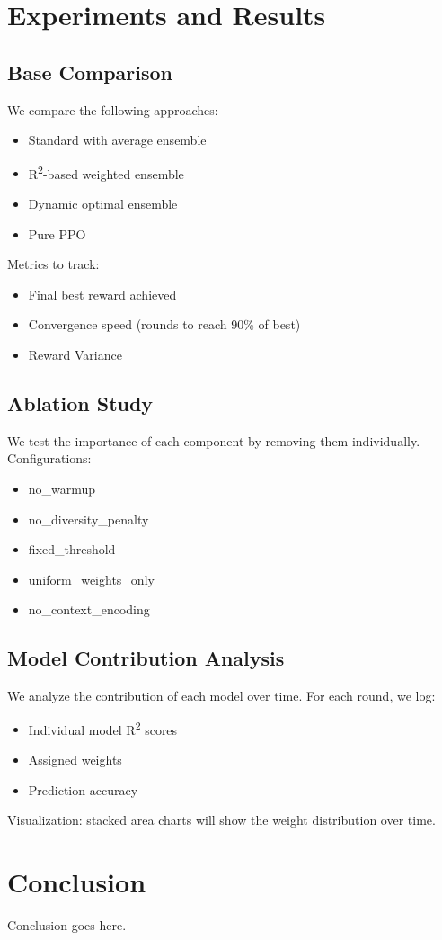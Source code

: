 \documentclass[conference]{IEEEtran}
\begin{document}
\section{Experiments and Results}

\subsection{Base Comparison}
We compare the following approaches:
\begin{itemize}
    \item Standard with average ensemble
    \item R\textsuperscript{2}-based weighted ensemble
    \item Dynamic optimal ensemble
    \item Pure PPO
\end{itemize}

Metrics to track:
\begin{itemize}
    \item Final best reward achieved
    \item Convergence speed (rounds to reach 90\% of best)
    \item Reward Variance
\end{itemize}

\subsection{Ablation Study}
We test the importance of each component by removing them individually.  
Configurations:
\begin{itemize}
    \item no\_warmup
    \item no\_diversity\_penalty
    \item fixed\_threshold
    \item uniform\_weights\_only
    \item no\_context\_encoding
\end{itemize}



\subsection{Model Contribution Analysis}
We analyze the contribution of each model over time.  
For each round, we log:
\begin{itemize}
    \item Individual model R\textsuperscript{2} scores
    \item Assigned weights
    \item Prediction accuracy
\end{itemize}

Visualization: stacked area charts will show the weight distribution over time.






\section{Conclusion}
Conclusion goes here.


\end{document}
